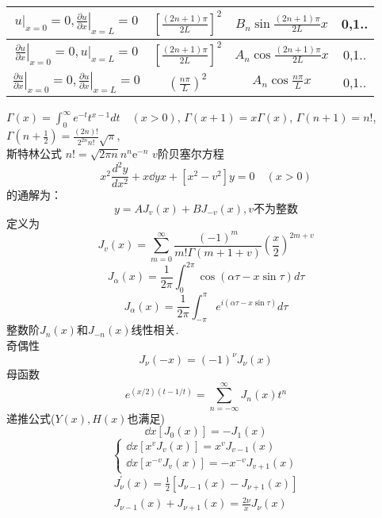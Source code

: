 \documentclass[UTF8,8pt]{ctexart}
\begin{document}
\begin{multicols}{2}
\begin{enumerate}
\begin{tabular}{|c|c|c|c|}
    $\left.u\right|_{x=0}=0,\left.\frac{\partial u}{\partial x}\right|_{x=L}=0$                             & $\left[\frac{(2 n+1) \pi}{2 L}\right]^{2}$ & $B_{n} \sin \frac{(2 n+1) \pi}{2 L} x$ & 0,1..  \\ \hline
    $\left.\frac{\partial u}{\partial x}\right|_{x=0}=0,\left.u\right|_{x=L}=0$                             & $\left[\frac{(2 n+1) \pi}{2 L}\right]^{2}$ & $A_{n} \cos \frac{(2 n+1) \pi}{2 L} x$ & 0,1..  \\ \hline
    $\left.\frac{\partial u}{\partial x}\right|_{x=0}=0,\left.\frac{\partial u}{\partial x}\right|_{x=L}=0$ & $\left(\frac{n \pi}{L}\right)^{2}$         & $A_{n} \cos \frac{n \pi}{L} x$         & 0,1..  \\ \hline
    \end{tabular}
    \end{enumerate}
    $\Gamma(x)=\int_{0}^{\infty} e^{-t} t^{x-1} d t \quad(x>0)$,
    $\Gamma(x+1)=x \Gamma(x)$,
    $ 
    \Gamma(n+1)=n !
    $,
    $
    \Gamma\left(n+\frac{1}{2}\right)=\frac{(2 n) !}{2^{2 n} n !} \sqrt{\pi}
    $,\\
    斯特林公式
    $
    n !=\sqrt{2 \pi n} n^{n} \mathrm{e}^{-n}
    $
    $v$阶贝塞尔方程$$ 
    x^{2} \frac{d^{2} y}{d x^{2}}+x \dd{y}{x}+\left[x^{2}-v^{2}\right] y=0 \quad(x>0)
    $$的通解为：$$ 
    y=A J_{v}(x)+B J_{-v}(x), v\text{不为整数}
    $$
    定义为
    $$ 
    J_{v}(x)=\sum_{m=0}^{\infty} \frac{(-1)^{m}}{m ! \Gamma(m+1+v)}\left(\frac{x}{2}\right)^{2 m+v}
    $$
    $$ 
    J_{\alpha}(x)=\frac{1}{2 \pi} \int_{0}^{2 \pi} \cos (\alpha \tau-x \sin \tau) d \tau
    $$
    $$ 
    J_{\alpha}(x)=\frac{1}{2 \pi} \int_{-\pi}^{\pi} e^{i(\alpha \tau-x \sin \tau)} d \tau
    $$
    整数阶$J_n(x)$和$J_{-n}(x)$线性相关. \\
    奇偶性$$ 
    J_{\nu}(-x)=(-1)^{\nu} J_{\nu}(x)
    $$
    母函数$$ 
    e^{(x / 2)(t-1 / t)}=\sum_{n=-\infty}^{\infty} J_{n}(x) t^{n}
    $$
    递推公式($Y(x),H(x)$也满足)$$ 
    \dd{}{x}\left[J_{0}(x)\right]=-J_{1}(x)
    $$
    $$ 
    \left\{\begin{array}{l}{\dd{}{x}\left[x^{v} J_{v}(x)\right]=x^{v} J_{v-1}(x)} \\ {\dd{}{x}\left[x^{-v} J_{v}(x)\right]=-x^{-v} J_{v+1}(x)}\end{array}\right.
    $$$$ 
    \begin{array}{l}{J_{\nu}^{\prime}(x)=\frac{1}{2}\left[J_{\nu-1}(x)-J_{\nu+1}(x)\right]} \\ {J_{\nu-1}(x)+J_{\nu+1}(x)=\frac{2 \nu}{x} J_{\nu}(x)}\end{array}
$$
\end{multicols}
\end{document}
